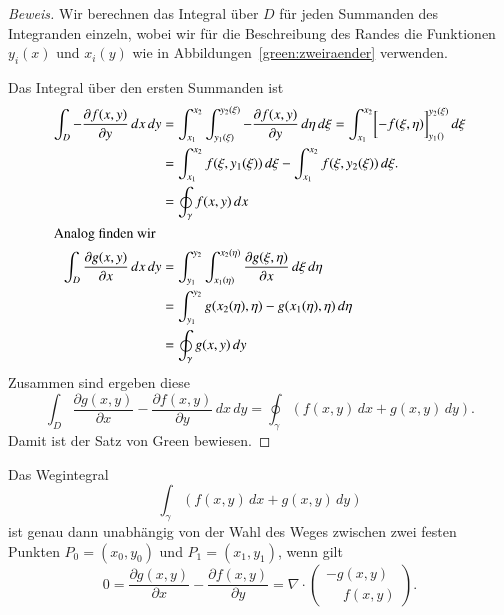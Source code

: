 \begin{proof}[Beweis]
Wir berechnen das Integral \label{skript:green formel}
über $D$ für jeden Summanden des Integranden einzeln, wobei
wir für die Beschreibung des Randes die Funktionen $y_i(x)$ und
$x_i(y)$ wie in Abbildungen~\ref{green:zweiraender} verwenden.

Das Integral über den ersten Summanden ist
\begin{align*}
\int_D
-\frac{\partial f(x,y)}{\partial y}
\,dx\,dy
&=
\int_{x_1}^{x_2}
\int_{y_1(\xi)}^{y_2(\xi)}
-\frac{\partial f(x,y)}{\partial y}
\,d\eta\,d\xi
=
\int_{x_1}^{x_2}
\biggl[
-f(\xi,\eta)
\biggr]_{y_1(\si)}^{y_2(\xi)}
\,d\xi
\\
&=
\int_{x_1}^{x_2} f(\xi,y_1(\xi))\,d\xi
-
\int_{x_1}^{x_2} f(\xi,y_2(\xi))\,d\xi.
\\
&=
\oint_\gamma f(x,y)\,dx
\\
\intertext{Analog finden wir}
\int_D
\frac{\partial g(x,y)}{\partial x}
\,dx\,dy
&=
\int_{y_1}^{y_2}
\int_{x_1(\eta)}^{x_2(\eta)}
\frac{\partial g(\xi,\eta)}{\partial x}
\,d\xi
\,d\eta
\\
&=
\int_{y_1}^{y_2}
g(x_2(\eta),\eta) - g(x_1(\eta),\eta)
\,d\eta
\\
&=
\oint_\gamma g(x,y)\,dy
\end{align*}
Zusammen sind ergeben diese
\[
\int_D
\frac{\partial g(x,y)}{\partial x}
-
\frac{\partial f(x,y)}{\partial y}
\,dx\,dy
=
\oint_\gamma
(
f(x,y)\,dx
+
g(x,y)\,dy
).
\]
Damit ist der Satz von Green bewiesen.
\end{proof}

\begin{satz}
\label{skript:wegunabhaengigkeit}
Das Wegintegral 
\[
\int_{\gamma}(f(x,y)\,dx + g(x,y)\,dy)
\]
ist genau dann unabhängig von der Wahl des Weges zwischen zwei
festen Punkten $P_0=(x_0,y_0)$ und $P_1=(x_1,y_1)$, wenn gilt
\[
0
=
\frac{\partial g(x,y)}{\partial x}-\frac{\partial f(x,y)}{\partial y}
=
\nabla\cdot
\begin{pmatrix}-g(x,y)\\\phantom{-}f(x,y)\end{pmatrix}.
\]
\end{satz}

